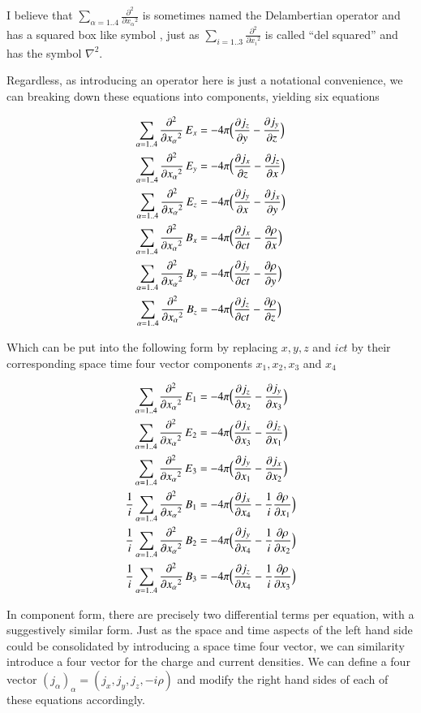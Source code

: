 \documentclass{article}      %
\newcommand{\delsquared}[0]{\nabla^2}
\newcommand{\delambert}[1]{\sum_{\alpha = 1 .. 4}{\Dsq{x_\alpha}{#1}}}
\newcommand{\D}[2] {\frac {\partial #2} {\partial #1}}
\newcommand{\Dsq}[2] {\frac {\partial^2 #2} {\partial {#1}^2}}
\begin{document}
I believe that 
$\delambert{}$ is sometimes named the Delambertian operator and has a squared box like symbol
, just as $\sum_{i = 1 .. 3}{\Dsq{x_i}{}}$ is called ``del squared'' and has the symbol $\delsquared$.

Regardless, as introducing an operator here is just a notational 
convenience, we can breaking down these equations 
into components, yielding six equations

\begin{align*}
\delambert{} \,E_x &= - 4\pi \Bigl(\D{y}{j_z} - \D{z}{j_y} \Bigr) \\
\delambert{} \,E_y &= - 4\pi \Bigl(\D{z}{j_x} - \D{x}{j_z} \Bigr) \\
\delambert{} \,E_z &= - 4\pi \Bigl(\D{x}{j_y} - \D{y}{j_x} \Bigr) \\
\delambert{} \,B_x &= - 4\pi \Bigl(\D{ct}{j_x} - \D{x}{\rho} \Bigr)\\
\delambert{} \,B_y &= - 4\pi \Bigl(\D{ct}{j_y} - \D{y}{\rho} \Bigr)\\
\delambert{} \,B_z &= - 4\pi \Bigl(\D{ct}{j_z} - \D{z}{\rho} \Bigr)
\end{align*}

Which can be put into the following form by replacing $x, y, z$ and $ict$ by their 
corresponding space time four vector components $x_1, x_2, x_3$ and $x_4$

\begin{align*}
            \delambert{} \,E_1 &= - 4\pi \Bigl( \D{x_2}{j_z} -             \D{x_3}{j_y} \Bigr) \\
            \delambert{} \,E_2 &= - 4\pi \Bigl( \D{x_3}{j_x} -             \D{x_1}{j_z} \Bigr) \\
            \delambert{} \,E_3 &= - 4\pi \Bigl( \D{x_1}{j_y} -             \D{x_2}{j_x} \Bigr) \\
\frac{1}{i} \delambert{} \,B_1 &= - 4\pi \Bigl( \D{x_4}{j_x} - \frac{1}{i} \D{x_1}{\rho} \Bigr)\\
\frac{1}{i} \delambert{} \,B_2 &= - 4\pi \Bigl( \D{x_4}{j_y} - \frac{1}{i} \D{x_2}{\rho} \Bigr)\\
\frac{1}{i} \delambert{} \,B_3 &= - 4\pi \Bigl( \D{x_4}{j_z} - \frac{1}{i} \D{x_3}{\rho} \Bigr)
\end{align*}

In component form,
there are precisely two differential terms per equation, with a suggestively 
similar form.
Just as the space and time aspects of the left hand side could be consolidated
by introducing a space time four vector, we can similarity introduce a four 
vector for the 
charge and current densities.
We can define a four vector $(j_\alpha)_\alpha = 
(j_x, j_y, j_z, -i \rho)$ and modify the right hand sides of each of these equations 
accordingly.
\end{document}
